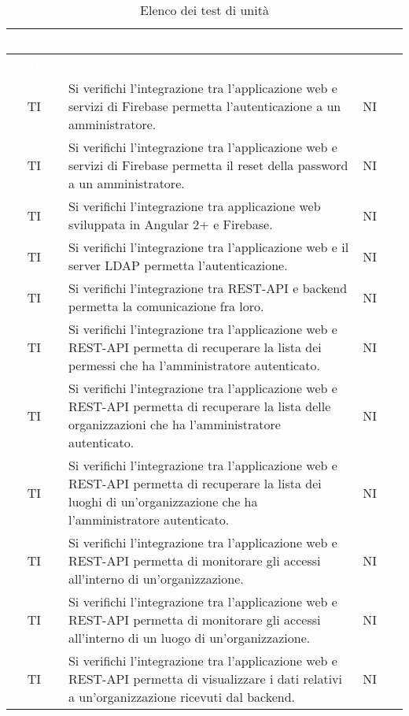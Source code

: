 {
\renewcommand{\arraystretch}{1.5}
\centering
\begin{longtable}{ c C{8.5cm} C{1cm}}
\caption{Elenco dei test di unità}\\
\textcolor{white}{\textbf{Codice}} & \textcolor{white}{\textbf{Descrizione}} & \textcolor{white}{\textbf{Stato}}\\
\endfirsthead
{}
\textcolor{white}{\textbf{Codice}} & \textcolor{white}{\textbf{Descrizione}} & \textcolor{white}{\textbf{Stato}}\\
\endhead

TI & Si verifichi l’integrazione tra l’applicazione web e servizi di Firebase permetta l’autenticazione a un amministratore. & NI \\
TI & Si verifichi l’integrazione tra l’applicazione web e servizi di Firebase permetta il reset della password a un amministratore. & NI \\
TI & Si verifichi l’integrazione tra applicazione web sviluppata in Angular 2+ e Firebase.& NI \\
TI & Si verifichi l’integrazione tra l’applicazione web e il server LDAP permetta l’autenticazione.& NI \\
TI & Si verifichi l’integrazione tra REST-API e backend permetta la comunicazione fra loro.& NI \\
TI & Si verifichi l’integrazione tra l’applicazione web e REST-API permetta di recuperare la lista dei permessi che ha l’amministratore autenticato.& NI \\
TI & Si verifichi l’integrazione tra l’applicazione web e REST-API permetta di recuperare la lista delle organizzazioni che ha l’amministratore autenticato.& NI \\
TI & Si verifichi l’integrazione tra l’applicazione web e REST-API permetta di recuperare la lista dei luoghi di un’organizzazione che ha l’amministratore autenticato.& NI \\
TI & Si verifichi l’integrazione tra l’applicazione web e REST-API permetta di monitorare gli accessi all’interno di un’organizzazione.& NI \\
TI & Si verifichi l’integrazione tra l’applicazione web e REST-API permetta di monitorare gli accessi all’interno di un luogo di un’organizzazione.& NI \\
TI & Si verifichi l’integrazione tra l’applicazione web e REST-API permetta di visualizzare i dati relativi a un’organizzazione ricevuti dal backend.& NI \\

\end{longtable}}
